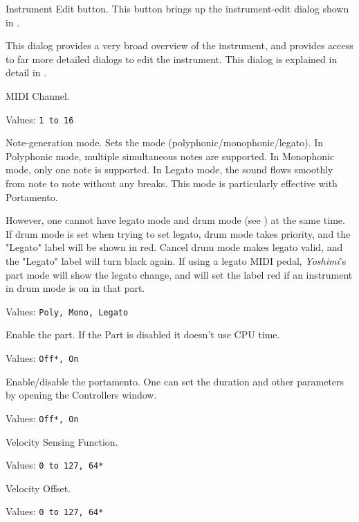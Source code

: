    Instrument Edit button.
   This button brings up the instrument-edit dialog shown in
   .

   This dialog provides a very broad overview of the instrument, and
   provides access to far more detailed dialogs to edit the instrument.
   This dialog is explained in detail in
   .

   MIDI Channel.

   Values: \texttt{1 to 16}

   Note-generation mode.
   Sets the mode (polyphonic/monophonic/legato).
   In Polyphonic mode, multiple simultaneous notes are supported.
   In Monophonic mode, only one note is supported.
   In Legato mode, the sound flows smoothly from note to note without
   any breaks.  This mode is particularly effective with Portamento.

	However, one cannot have legato mode and drum mode
	(see )
   at the same time. If drum mode is set when trying to set legato,
   drum mode takes priority, and the "Legato" label will be shown in red.
   Cancel drum mode makes legato valid, and the "Legato" label
   will turn black again.
   If using a legato MIDI pedal, \textsl{Yoshimi}'s part mode will show
   the legato change, and will set the label red if an instrument in drum mode
   is on in that part.

   Values: \texttt{Poly, Mono, Legato}

   Enable the part. If the Part is disabled it doesn't use CPU time.

   Values: \texttt{Off*, On}

   Enable/disable the portamento.
   One can set the duration and other parameters by opening the Controllers
   window.

   Values: \texttt{Off*, On}

   Velocity Sensing Function.

   Values: \texttt{0 to 127, 64*}

   Velocity Offset.

   Values: \texttt{0 to 127, 64*}

